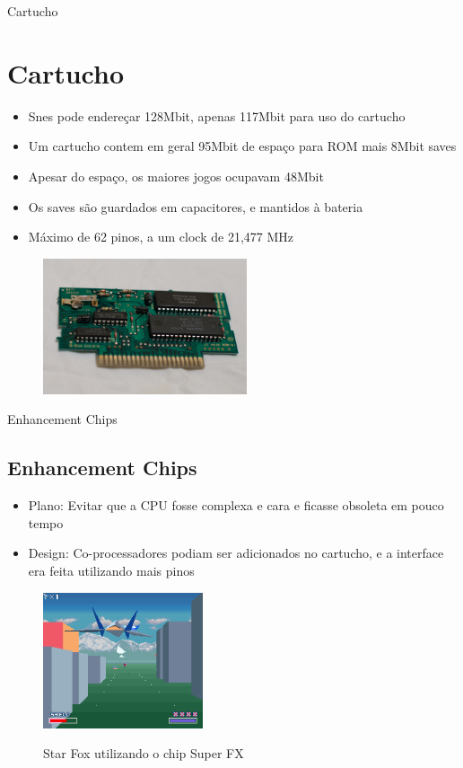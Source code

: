 \documentclass[xcolor=svgnames,handout]{beamer}
\begin{document}

\begin{frame}{Cartucho}
\section{Cartucho}
\begin{itemize}
	\item Snes pode endereçar 128Mbit, apenas 117Mbit para uso do cartucho\pause
	\item Um cartucho contem em geral 95Mbit de espaço para ROM mais 8Mbit saves\pause
	\item Apesar do espaço, os maiores jogos ocupavam 48Mbit\pause
	\item Os saves são guardados em capacitores, e mantidos à bateria\pause
	\item Máximo de 62 pinos, a um clock de 21,477 MHz
\end{itemize}
\begin{figure}
  \begin{center}
    \includegraphics[height=4cm, width=\textwidth, keepaspectratio]{imagens/cartucho}
    \label{fig:}
  \end{center}
\end{figure}
\end{frame}

\begin{frame}{Enhancement Chips}
\subsection{Enhancement Chips}
\begin{itemize}
  \item{Plano: Evitar que a CPU fosse complexa e cara e ficasse obsoleta em pouco tempo}
  \item{Design: Co-processadores podiam ser adicionados no cartucho, e a interface era feita utilizando mais pinos}
\end{itemize}
\begin{figure}
  \begin{center}
    \includegraphics[height=4cm, width=\textwidth, keepaspectratio]{SNES_Star_Fox.png}
    \label{fig:}
    \caption{Star Fox utilizando o chip Super FX}
  \end{center}
\end{figure}
\end{frame}
\end{document}
